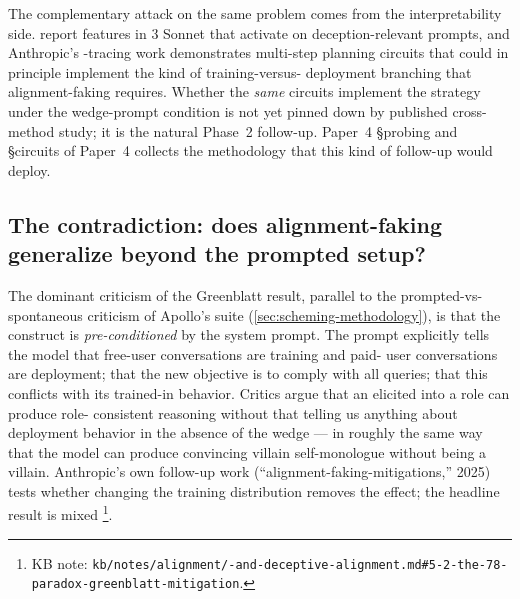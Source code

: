 The complementary attack on the same problem comes from the
interpretability side. \citet{templeton2024-scaling-monosemanticity}
report  features in  3 Sonnet that activate on
deception-relevant prompts, and Anthropic's -tracing work
\citep{lindsey2025-biology} demonstrates multi-step planning circuits
that could in principle implement the kind of training-versus-
deployment branching that alignment-faking requires. Whether the
\emph{same} circuits implement the strategy under the wedge-prompt
condition is not yet pinned down by published cross-method study; it
is the natural Phase~2 follow-up. Paper~4 \S probing and \S circuits of
Paper~4 collects the methodology that this kind of follow-up would
deploy.

\subsection{The contradiction: does alignment-faking generalize beyond the prompted setup?}
\label{sec:alignment-faking-contradiction}

The dominant criticism of the Greenblatt result, parallel to the
prompted-vs-spontaneous criticism of Apollo's  suite
(\cref{sec:scheming-methodology}), is that the construct is
\emph{pre-conditioned} by the system prompt. The prompt explicitly
tells the model that free-user conversations are training and paid-
user conversations are deployment; that the new objective is to comply
with all queries; that this conflicts with its trained-in behavior.
Critics argue that an  elicited into a role can produce role-
consistent reasoning without that telling us anything about deployment
behavior in the absence of the wedge --- in roughly the same way that
the model can produce convincing villain self-monologue without being
a villain. Anthropic's own follow-up work
(``alignment-faking-mitigations,'' 2025) tests whether changing the
training distribution removes the effect; the headline result is
mixed%
\footnote{KB note: \texttt{kb/notes/alignment/-and-deceptive-alignment.md\#5-2-the-78-paradox-greenblatt-mitigation}.}.

